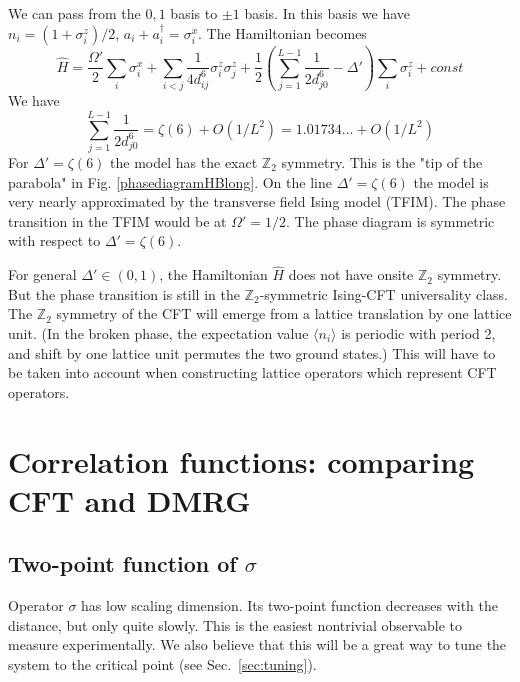 \documentclass[a4paper,11pt]{article}
\newcommand{\beq}{\begin{equation}}
\newcommand{\eeq}{\end{equation}}
\theoremstyle{remark}
\theoremstyle{theorem}
\begin{document}
We can pass from the $0,1$ basis to $\pm 1$ basis. In this basis we have $n_i=(1+\sigma^z_i)/2$, $a_i+a^\dagger_i=\sigma^x_i$. The Hamiltonian becomes
\beq
\hat H = \frac{\Omega'}{2} \sum_i \sigma^x_i + \sum_{i<j}\frac{1}{4d_{ij}^6}  \sigma^z_{i}\sigma^z_{j}+ \frac 12 (\sum_{j=1}^{L-1} \frac{1}{2d_{j0}^6} - \Delta') \sum_{i}  \sigma^z_{i} + const
\eeq
We have
\beq
\sum_{j=1}^{L-1} \frac{1}{2d_{j0}^6} = \zeta(6) +O(1/L^2)=1.01734\ldots+O(1/L^2)
\eeq
For $\Delta'=\zeta(6)$ the model has the exact $\mathbb{Z}_2$ symmetry. This is the "tip of the parabola" in Fig. \ref{phasediagramHBlong}. On the line $\Delta'=\zeta(6)$ the model is very nearly approximated by the transverse field Ising model (TFIM). The phase transition in the TFIM would be at $\Omega'=1/2$. The phase diagram is symmetric with respect to $\Delta'=\zeta(6)$.

For general $\Delta'\in(0,1)$, the Hamiltonian $\hat H$ does not have onsite $\mathbb{Z}_2$ symmetry. But the phase transition is still in the $\mathbb{Z}_2$-symmetric Ising-CFT universality class. The $\mathbb{Z}_2$ symmetry of the CFT will emerge from a lattice translation by one lattice unit. (In the broken phase, the expectation value $\langle n_i \rangle$ is periodic with period 2, and shift by one lattice unit permutes the two ground states.) This will have to be taken into account when constructing lattice operators which represent CFT operators.

\section{Correlation functions: comparing CFT and DMRG}

\subsection{Two-point function of $\sigma$}

Operator $\sigma$ has low scaling dimension. Its two-point function decreases with the distance, but only quite slowly. This is the easiest nontrivial observable to measure experimentally. We also believe that this will be a great way to tune the system to the critical point (see Sec.~\ref{sec:tuning}).
\end{document}
